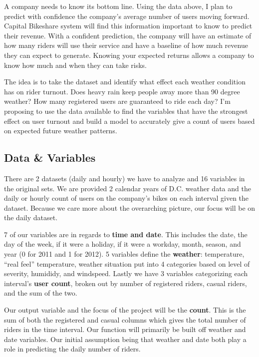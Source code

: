 \documentclass[]{article}
\begin{document}
A company needs to know its bottom line. Using the data above, I plan to
predict with confidence the company's average number of users moving
forward. Capital Bikeshare system will find this information important
to know to predict their revenue. With a confident prediction, the
company will have an estimate of how many riders will use their service
and have a baseline of how much revenue they can expect to generate.
Knowing your expected returns allows a company to know how much and when
they can take risks.

The idea is to take the dataset and identify what effect each weather
condition has on rider turnout. Does heavy rain keep people away more
than 90 degree weather? How many registered users are guaranteed to ride
each day? I'm proposing to use the data available to find the variables
that have the strongest effect on user turnout and build a model to
accurately give a count of users based on expected future weather
patterns.

\subsection{Data \& Variables}\label{data-variables}

There are 2 datasets (daily and hourly) we have to analyze and 16
variables in the original sets. We are provided 2 calendar years of D.C.
weather data and the daily or hourly count of users on the company's
bikes on each interval given the dataset. Because we care more about the
overarching picture, our focus will be on the daily dataset.

7 of our variables are in regards to \textbf{time and date}. This
includes the date, the day of the week, if it were a holiday, if it were
a workday, month, season, and year (0 for 2011 and 1 for 2012). 5
variables define the \textbf{weather}: temperature, ``real feel''
temperature, weather situation put into 4 categories based on level of
severity, humididy, and windspeed. Lastly we have 3 variables
categorizing each interval's \textbf{user count}, broken out by number
of registered riders, casual riders, and the sum of the two.

Our output variable and the focus of the project will be the
\textbf{count}. This is the sum of both the registered and casual
columns which gives the total number of riders in the time interval. Our
function will primarily be built off weather and date variables. Our
initial assumption being that weather and date both play a role in
predicting the daily number of riders.
\end{document}
